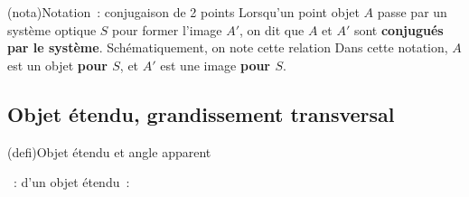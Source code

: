 \documentclass[../../main/main.tex]{subfiles}
\begin{document}
\begin{tcb}[label=nota_opt](nota){Notation~: conjugaison de 2 points}
	Lorsqu'un point objet $A$ passe par un système optique $S$ pour former
	l'image $A'$, on dit que $A$ et $A'$ sont \textbf{conjugués par le système}.
	Schématiquement, on note cette relation
	Dans cette notation, $A$ est un objet \textbf{pour $S$}, et $A'$ est une
	image \textbf{pour $S$}.
\end{tcb}

\subsection{Objet étendu, grandissement transversal}
\begin{tcb}[label=def:objet](defi){Objet étendu et angle apparent}
	\begin{itemize}[label=$\diamond$, leftmargin=10pt]
		~: 
		 d'un objet étendu~: 
	\end{itemize}
\end{tcb}
\end{document}
